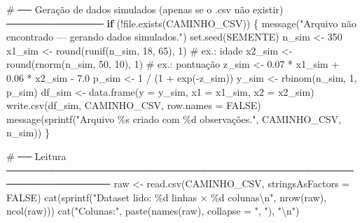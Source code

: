 \documentclass[
  letterpaper,
  DIV=11,
  numbers=noendperiod]{scrartcl}
\newenvironment{Shaded}{\begin{snugshade}}{\end{snugshade}}
\newcommand{\AttributeTok}[1]{\textcolor[rgb]{0.40,0.45,0.13}{#1}}
\newcommand{\CommentTok}[1]{\textcolor[rgb]{0.37,0.37,0.37}{#1}}
\newcommand{\ConstantTok}[1]{\textcolor[rgb]{0.56,0.35,0.01}{#1}}
\newcommand{\ControlFlowTok}[1]{\textcolor[rgb]{0.00,0.23,0.31}{\textbf{#1}}}
\newcommand{\DecValTok}[1]{\textcolor[rgb]{0.68,0.00,0.00}{#1}}
\newcommand{\FloatTok}[1]{\textcolor[rgb]{0.68,0.00,0.00}{#1}}
\newcommand{\FunctionTok}[1]{\textcolor[rgb]{0.28,0.35,0.67}{#1}}
\newcommand{\NormalTok}[1]{\textcolor[rgb]{0.00,0.23,0.31}{#1}}
\newcommand{\OtherTok}[1]{\textcolor[rgb]{0.00,0.23,0.31}{#1}}
\newcommand{\SpecialCharTok}[1]{\textcolor[rgb]{0.37,0.37,0.37}{#1}}
\newcommand{\StringTok}[1]{\textcolor[rgb]{0.13,0.47,0.30}{#1}}
\begin{document}
\begin{Shaded}
\begin{Highlighting}[]
\CommentTok{\# ── Geração de dados simulados (apenas se o .csv não existir) ──────────────}
\ControlFlowTok{if}\NormalTok{ (}\SpecialCharTok{!}\FunctionTok{file.exists}\NormalTok{(CAMINHO\_CSV)) \{}
  \FunctionTok{message}\NormalTok{(}\StringTok{"Arquivo não encontrado — gerando dados simulados."}\NormalTok{)}
  \FunctionTok{set.seed}\NormalTok{(SEMENTE)}
\NormalTok{  n\_sim  }\OtherTok{\textless{}{-}} \DecValTok{350}
\NormalTok{  x1\_sim }\OtherTok{\textless{}{-}} \FunctionTok{round}\NormalTok{(}\FunctionTok{runif}\NormalTok{(n\_sim, }\DecValTok{18}\NormalTok{, }\DecValTok{65}\NormalTok{), }\DecValTok{1}\NormalTok{)   }\CommentTok{\# ex.: idade}
\NormalTok{  x2\_sim }\OtherTok{\textless{}{-}} \FunctionTok{round}\NormalTok{(}\FunctionTok{rnorm}\NormalTok{(n\_sim, }\DecValTok{50}\NormalTok{, }\DecValTok{10}\NormalTok{),  }\DecValTok{1}\NormalTok{)   }\CommentTok{\# ex.: pontuação}
\NormalTok{  z\_sim  }\OtherTok{\textless{}{-}} \FloatTok{0.07} \SpecialCharTok{*}\NormalTok{ x1\_sim }\SpecialCharTok{+} \FloatTok{0.06} \SpecialCharTok{*}\NormalTok{ x2\_sim }\SpecialCharTok{{-}} \FloatTok{7.0}
\NormalTok{  p\_sim  }\OtherTok{\textless{}{-}} \DecValTok{1} \SpecialCharTok{/}\NormalTok{ (}\DecValTok{1} \SpecialCharTok{+} \FunctionTok{exp}\NormalTok{(}\SpecialCharTok{{-}}\NormalTok{z\_sim))}
\NormalTok{  y\_sim  }\OtherTok{\textless{}{-}} \FunctionTok{rbinom}\NormalTok{(n\_sim, }\DecValTok{1}\NormalTok{, p\_sim)}
\NormalTok{  df\_sim }\OtherTok{\textless{}{-}} \FunctionTok{data.frame}\NormalTok{(}\AttributeTok{y =}\NormalTok{ y\_sim, }\AttributeTok{x1 =}\NormalTok{ x1\_sim, }\AttributeTok{x2 =}\NormalTok{ x2\_sim)}
  \FunctionTok{write.csv}\NormalTok{(df\_sim, CAMINHO\_CSV, }\AttributeTok{row.names =} \ConstantTok{FALSE}\NormalTok{)}
  \FunctionTok{message}\NormalTok{(}\FunctionTok{sprintf}\NormalTok{(}\StringTok{"Arquivo \textquotesingle{}\%s\textquotesingle{} criado com \%d observações."}\NormalTok{, CAMINHO\_CSV, n\_sim))}
\NormalTok{\}}

\CommentTok{\# ── Leitura ─────────────────────────────────────────────────────────────────}
\NormalTok{raw }\OtherTok{\textless{}{-}} \FunctionTok{read.csv}\NormalTok{(CAMINHO\_CSV, }\AttributeTok{stringsAsFactors =} \ConstantTok{FALSE}\NormalTok{)}
\FunctionTok{cat}\NormalTok{(}\FunctionTok{sprintf}\NormalTok{(}\StringTok{"Dataset lido: \%d linhas × \%d colunas}\SpecialCharTok{\textbackslash{}n}\StringTok{"}\NormalTok{, }\FunctionTok{nrow}\NormalTok{(raw), }\FunctionTok{ncol}\NormalTok{(raw)))}
\FunctionTok{cat}\NormalTok{(}\StringTok{"Colunas:"}\NormalTok{, }\FunctionTok{paste}\NormalTok{(}\FunctionTok{names}\NormalTok{(raw), }\AttributeTok{collapse =} \StringTok{", "}\NormalTok{), }\StringTok{"}\SpecialCharTok{\textbackslash{}n}\StringTok{"}\NormalTok{)}


\end{Highlighting}
\end{Shaded}
\end{document}
